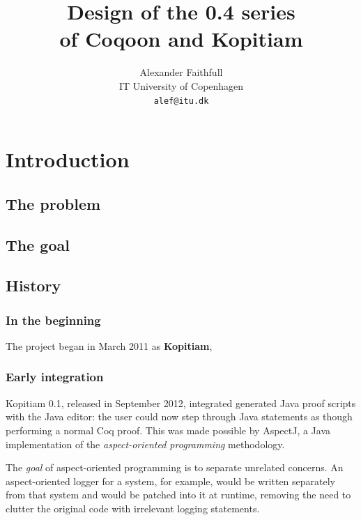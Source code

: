 \documentclass{article}
\author{Alexander Faithfull\\IT University of Copenhagen\\\texttt{alef@itu.dk}}
\title{Design of the 0.4 series\\of Coqoon and Kopitiam}
\newcommand{\fdef}[1]{\textit{#1}}
\newcommand{\name}[1]{\textbf{#1}}
\begin{document}
\maketitle


\tableofcontents

\pagebreak

\section{Introduction}

\subsection{The problem}

\subsection{The goal}

\subsection{History}

\subsubsection{In the beginning}

The project began in March 2011 as \name{Kopitiam}, 

\subsubsection{Early integration}

Kopitiam 0.1, released in September 2012, integrated generated Java proof
scripts with the Java editor: the user could now step through Java statements
as though performing a normal Coq proof. This was made possible by AspectJ, a
Java implementation of the \fdef{aspect-oriented programming} methodology.

The \emph{goal} of aspect-oriented programming is to separate unrelated
concerns. An aspect-oriented logger for a system, for example, would be written
separately from that system and would be patched into it at runtime, removing
the need to clutter the original code with irrelevant logging statements.
\end{document}
